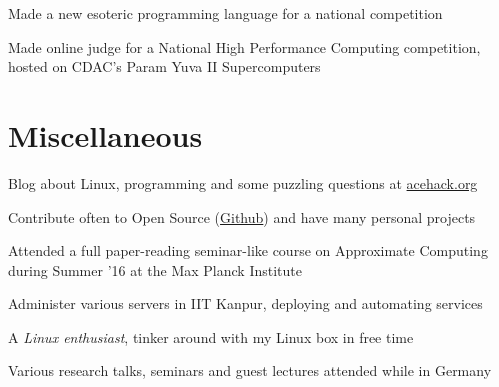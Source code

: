 \documentclass[a4paper]{deedy-resume} %
\begin{document}
\begin{minipage}[t]{0.66\textwidth}
  \sectionspace

  \runsubsection{}
  \begin{tightitemize}
    \item Made a new esoteric programming language for a national
      competition
    \item Made online judge for a National High Performance Computing competition, hosted on CDAC’s Param Yuva II Supercomputers
  \end{tightitemize}

  \section{Miscellaneous}
  \vspace{\topsep}
  \begin{tightitemize}
  \item Blog about Linux, programming and some puzzling questions at
    \href{http://acehack.org}{acehack.org}
  \item Contribute often to Open Source
    (\href{https://github.com/sakshamsharma}{Github}) and have many
    personal projects
  \item	Attended a full paper-reading seminar-like course on
    Approximate Computing during Summer ’16 at the Max Planck
    Institute
  \item Administer various servers in IIT Kanpur, deploying and
    automating services
  \item A \textit{Linux enthusiast}, tinker around with my Linux box
    in free time
  \item Various research talks, seminars and guest lectures attended
    while in Germany
  \end{tightitemize}

\end{minipage}




\end{document}
